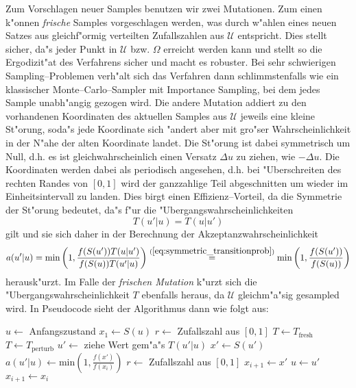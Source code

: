 	Zum Vorschlagen neuer Samples benutzen wir zwei Mutationen. Zum einen k"onnen {\em frische} Samples vorgeschlagen werden, was durch w"ahlen eines neuen Satzes aus gleichf"ormig verteilten Zufallszahlen aus $\mathcal{U}$ entspricht. Dies stellt sicher, da"s jeder Punkt in $\mathcal{U}$ bzw. $\Omega$ erreicht werden kann und stellt so die Ergodizit"at des Verfahrens sicher und macht es robuster. Bei sehr schwierigen Sampling--Problemen verh"alt sich das Verfahren dann schlimmstenfalls wie ein klassischer Monte--Carlo--Sampler mit Importance Sampling, bei dem jedes Sample unabh"angig gezogen wird.
	Die andere Mutation addiert zu den vorhandenen Koordinaten des aktuellen Samples aus $\mathcal{U}$ jeweils eine kleine St"orung, soda"s jede Koordinate sich "andert aber mit gro"ser Wahrscheinlichkeit in der N"ahe der alten Koordinate landet. Die St"orung ist dabei symmetrisch um Null, d.h. es ist gleichwahrscheinlich einen Versatz $\Delta u$ zu ziehen, wie $-\Delta u$. Die Koordinaten werden dabei als periodisch angesehen, d.h. bei "Uberschreiten des rechten Randes von $[0,1]$ wird der ganzzahlige Teil abgeschnitten um wieder im Einheitsintervall zu landen. Dies birgt einen Effizienz--Vorteil, da die Symmetrie der St"orung bedeutet, da"s f"ur die "Ubergangswahrscheinlichkeiten
	\begin{equation}
	  T(u'|u)=T(u|u')
	  \label{eq:symmetric_transitionprob}
	\end{equation}
	gilt und sie sich daher in der Berechnung der Akzeptanzwahrscheinlichkeit
	$$a(u'|u)=\text{min}\left(1,\frac{f(S(u'))T(u|u')}{f(S(u))T(u'|u)}\right)\stackrel{(\ref{eq:symmetric_transitionprob})}{=}\text{min}\left(1,\frac{f(S(u'))}{f(S(u))}\right)$$
	herausk"urzt. Im Falle der {\em frischen Mutation} k"urzt sich die "Ubergangswahrscheinlichkeit $T$ ebenfalls heraus, da $\mathcal{U}$ gleichm"a"sig gesampled wird.
	In Pseudocode sieht der Algorithmus dann wie folgt aus:
	\begin{algorithmic}
		\STATE $u \leftarrow$ Anfangszustand
		\STATE $x_1 \leftarrow S(u)$
			\STATE $r\leftarrow$ Zufallszahl aus $[0,1]$
						\STATE $T \leftarrow T_\text{fresh}$
			\ELSE	\STATE $T \leftarrow T_\text{perturb}$
			\ENDIF
			\STATE $u'\leftarrow$ ziehe Wert gem"a"s $T(u'|u)$
			\STATE $x' \leftarrow S(u')$
			\STATE $a(u'|u) \leftarrow \text{min}\left(1,\frac{f(x')}{f(x_i)}\right)$
			\STATE $r\leftarrow$ Zufallszahl aus $[0,1]$
			  \STATE $x_{i+1} \leftarrow x'$
			  \STATE $u \leftarrow u'$
			\ELSE	\STATE $x_{i+1} \leftarrow x_i$
			\ENDIF
	  \ENDFOR
	\end{algorithmic}

